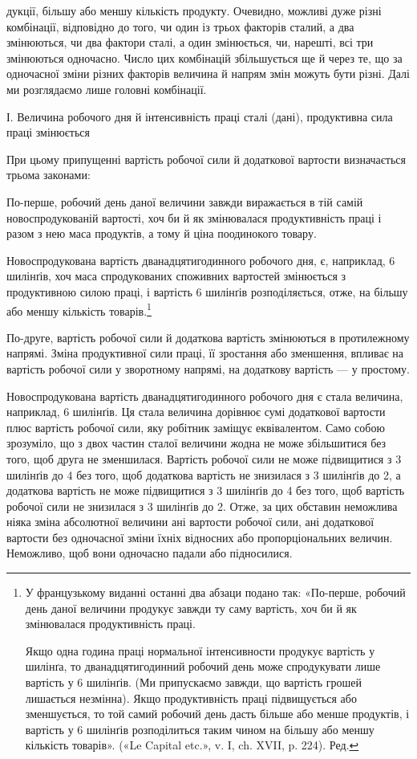 дукції, більшу або меншу кількість продукту. Очевидно, можливі
дуже різні комбінації, відповідно до того, чи один із трьох факторів
сталий, а два змінюються, чи два фактори сталі, а один
змінюється, чи, нарешті, всі три змінюються одночасно. Число
цих комбінацій збільшується ще й через те, що за одночасної
зміни різних факторів величина й напрям змін можуть бути
різні. Далі ми розглядаємо лише головні комбінації.

І. Величина робочого дня й інтенсивність праці сталі (дані),
продуктивна сила праці змінюється

При цьому припущенні вартість робочої сили й додаткової
вартости визначається трьома законами:

По-перше, робочий день даної величини завжди виражається
в тій самій новоспродукованій вартості, хоч би й як змінювалася
продуктивність праці і разом з нею маса продуктів, а тому й
ціна поодинокого товару.

Новоспродукована вартість дванадцятигодинного робочого
дня, є, наприклад, 6 шилінґів, хоч маса спродукованих споживних
вартостей змінюється з продуктивною силою праці, і вартість
6 шилінґів розподіляється, отже, на більшу або меншу кількість
товарів.\footnote*{
У французькому виданні останні два абзаци подано так: «По-перше,
робочий день даної величини продукує завжди ту саму вартість,
хоч би й як змінювалася продуктивність праці.

Якщо одна година праці нормальної інтенсивности продукує вартість
у  шилінґа, то дванадцятигодинний робочий день може спродукувати
лише вартість у 6 шилінґів. (Ми припускаємо завжди, що вартість грошей
лишається незмінна). Якщо продуктивність праці підвищується або зменшується,
то той самий робочий день дасть більше або менше продуктів,
і вартість у 6 шилінґів розподілиться таким чином на більшу або меншу
кількість товарів». («Le Capital etc.», v. I, ch. XVII, p. 224). Ред.
}

По-друге, вартість робочої сили й додаткова вартість змінюються
в протилежному напрямі. Зміна продуктивної сили праці,
її зростання або зменшення, впливає на вартість робочої сили у
зворотному напрямі, на додаткову вартість — у простому.

Новоспродукована вартість дванадцятигодинного робочого
дня є стала величина, наприклад, 6 шилінґів. Ця стала величина
дорівнює сумі додаткової вартости плюс вартість робочої сили,
яку робітник заміщує еквівалентом. Само собою зрозуміло, що
з двох частин сталої величини жодна не може збільшитися без
того, щоб друга не зменшилася. Вартість робочої сили не може
підвищитися з 3 шилінґів до 4 без того, щоб додаткова вартість
не знизилася з 3 шилінґів до 2, а додаткова вартість не може
підвищитися з 3 шилінґів до 4 без того, щоб вартість робочої
сили не знизилася з 3 шилінґів до 2. Отже, за цих обставин неможлива
ніяка зміна абсолютної величини ані вартости робочої
сили, ані додаткової вартости без одночасної зміни їхніх відносних
або пропорціональних величин. Неможливо, щоб вони одночасно
падали або підносилися.